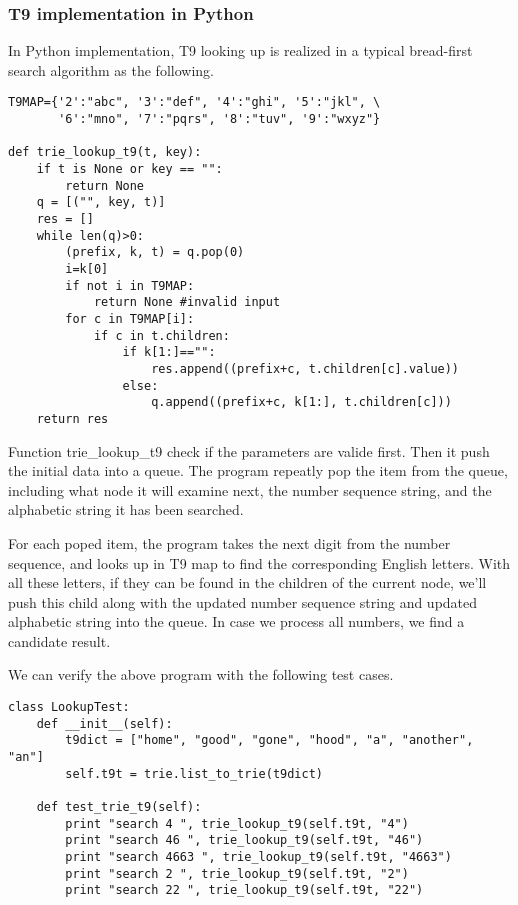 \documentclass{article}
\begin{document}
\subsubsection*{T9 implementation in Python}

In Python implementation, T9 looking up is realized in a typical bread-first search algorithm as the following.

\lstset{language=Python}
\begin{lstlisting}
T9MAP={'2':"abc", '3':"def", '4':"ghi", '5':"jkl", \
       '6':"mno", '7':"pqrs", '8':"tuv", '9':"wxyz"}
                
def trie_lookup_t9(t, key):
    if t is None or key == "":
        return None
    q = [("", key, t)]
    res = []
    while len(q)>0:
        (prefix, k, t) = q.pop(0)
        i=k[0]
        if not i in T9MAP:
            return None #invalid input
        for c in T9MAP[i]:
            if c in t.children:
                if k[1:]=="":
                    res.append((prefix+c, t.children[c].value))
                else:
                    q.append((prefix+c, k[1:], t.children[c]))
    return res
\end{lstlisting}

Function trie\_lookup\_t9 check if the parameters are valide first. Then
it push the initial data into a queue. The program repeatly pop the item
from the queue, including what node it will examine next, the number sequence
string, and the alphabetic string it has been searched.

For each poped item, the program takes the next digit from the number
sequence, and looks up in T9 map to find the corresponding English letters.
With all these letters, if they can be found in the children of the current
node, we'll push this child along with the updated number sequence string
and updated alphabetic string into the queue. In case we process all 
numbers, we find a candidate result.

We can verify the above program with the following test cases.

\begin{lstlisting}
class LookupTest:
    def __init__(self):
        t9dict = ["home", "good", "gone", "hood", "a", "another", "an"]
        self.t9t = trie.list_to_trie(t9dict)

    def test_trie_t9(self):
        print "search 4 ", trie_lookup_t9(self.t9t, "4")
        print "search 46 ", trie_lookup_t9(self.t9t, "46")
        print "search 4663 ", trie_lookup_t9(self.t9t, "4663")
        print "search 2 ", trie_lookup_t9(self.t9t, "2")
        print "search 22 ", trie_lookup_t9(self.t9t, "22")
\end{lstlisting}
\end{document}
